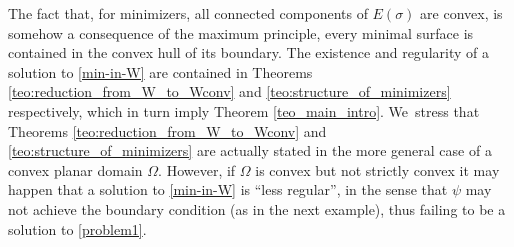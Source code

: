 The fact that, for minimizers, all connected components of $E(\sigma)$ are convex, is somehow a consequence of the maximum principle, \ie every minimal surface is contained in the convex hull of its boundary.
The existence and regularity of a solution to \eqref{min-in-W} are contained in Theorems \ref{teo:reduction_from_W_to_Wconv} and \ref{teo:structure_of_minimizers}
respectively, which in turn imply Theorem \ref{teo_main_intro}. We~stress that Theorems \ref{teo:reduction_from_W_to_Wconv} and \ref{teo:structure_of_minimizers} are actually stated in the more general case of
a convex planar domain $\Omega$. However, if $\Omega$ is convex but not strictly convex it may happen that a solution to \eqref{min-in-W} is ``less regular'', in the sense that $\psi$ may not achieve the boundary condition (as in the next example),
thus failing to be a solution to \eqref{problem1}.

